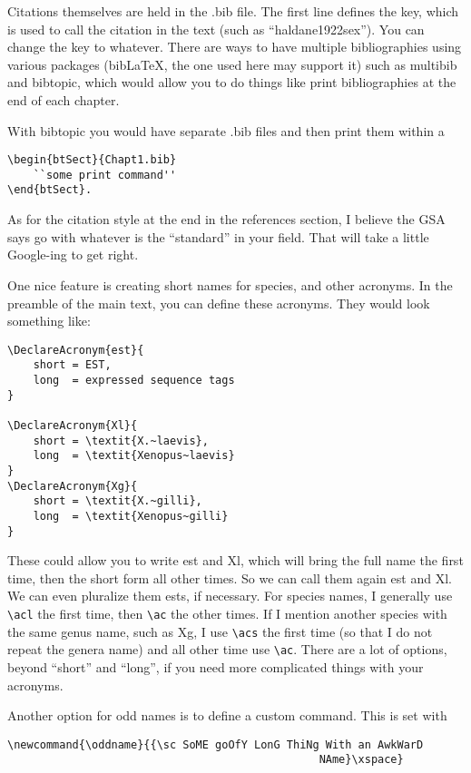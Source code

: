 Citations themselves are held in the .bib file. The first line defines the key, which is used to call the citation in the text (such as ``haldane1922sex''). You can change the key to whatever. There are ways to have multiple bibliographies using various packages (bib\LaTeX{}, the one used here may support it) such as multibib and bibtopic, which would allow you to do things like print bibliographies at the end of each chapter. 

With bibtopic you would have separate .bib files and then print them within a 
\begin{verbatim}
\begin{btSect}{Chapt1.bib}
	``some print command''
\end{btSect}.
\end{verbatim}

As for the citation style at the end in the references section, I believe the GSA says go with whatever is the ``standard'' in your field. That will take a little Google-ing to get right. 

\clearpage %

One nice feature is creating short names for species, and other acronyms. In the preamble of the main text, you can define these acronyms. They would look something like:
\begin{verbatim}
\DeclareAcronym{est}{
	short = EST,
	long  = expressed sequence tags
}

\DeclareAcronym{Xl}{
	short = \textit{X.~laevis},
	long  = \textit{Xenopus~laevis}
}
\DeclareAcronym{Xg}{
	short = \textit{X.~gilli},
	long  = \textit{Xenopus~gilli}
}
\end{verbatim}

These could allow you to write \ac{est} and \acl{Xl}, which will bring the full name the first time, then the short form all other times. So we can call them again \ac{est} and \ac{Xl}. We can even pluralize them \acp{est}, if necessary. For species names, I generally use \verb+\acl+ the first time, then \verb+\ac+ the other times. If I mention another species with the same genus name, such as \acs{Xg}, I use \verb+\acs+ the first time (so that I do not repeat the genera name) and all other time use \verb+\ac+. There are a lot of options, beyond ``short'' and ``long'', if you need more complicated things with your acronyms. 

Another option for odd names is to define a custom command. This is set with
\begin{verbatim}
\newcommand{\oddname}{{\sc SoME goOfY LonG ThiNg With an AwkWarD 
                                                NAme}\xspace}
\end{verbatim}

